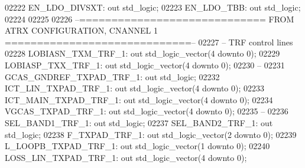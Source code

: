 \begin{DoxyCode}
02222     EN\_LDO\_DIVSXT:  \textcolor{keywordflow}{out} \textcolor{comment}{std\_logic};
02223     EN\_LDO\_TBB: \textcolor{keywordflow}{out} \textcolor{comment}{std\_logic};
02224 
02225 
02226 \textcolor{keyword}{    --============================= FROM ATRX CONFIGURATION, CNANNEL 1 =============================--}
02227 \textcolor{keyword}{    -- TRF control lines}
02228     LOBIASN\_TXM\_TRF\_1:  \textcolor{keywordflow}{out} \textcolor{comment}{std\_logic\_vector}(\textcolor{vhdllogic}{}\textcolor{vhdllogic}{4} \textcolor{keywordflow}{downto} \textcolor{vhdllogic}{}\textcolor{vhdllogic}{0});
02229     LOBIASP\_TXX\_TRF\_1:  \textcolor{keywordflow}{out} \textcolor{comment}{std\_logic\_vector}(\textcolor{vhdllogic}{}\textcolor{vhdllogic}{4} \textcolor{keywordflow}{downto} \textcolor{vhdllogic}{}\textcolor{vhdllogic}{0});
02230 \textcolor{keyword}{    --}
02231     GCAS\_GNDREF\_TXPAD\_TRF\_1:    \textcolor{keywordflow}{out} \textcolor{comment}{std\_logic};
02232     ICT\_LIN\_TXPAD\_TRF\_1:    \textcolor{keywordflow}{out} \textcolor{comment}{std\_logic\_vector}(\textcolor{vhdllogic}{}\textcolor{vhdllogic}{4} \textcolor{keywordflow}{downto} \textcolor{vhdllogic}{}\textcolor{vhdllogic}{0});
02233     ICT\_MAIN\_TXPAD\_TRF\_1:   \textcolor{keywordflow}{out} \textcolor{comment}{std\_logic\_vector}(\textcolor{vhdllogic}{}\textcolor{vhdllogic}{4} \textcolor{keywordflow}{downto} \textcolor{vhdllogic}{}\textcolor{vhdllogic}{0});
02234     VGCAS\_TXPAD\_TRF\_1:  \textcolor{keywordflow}{out} \textcolor{comment}{std\_logic\_vector}(\textcolor{vhdllogic}{}\textcolor{vhdllogic}{4} \textcolor{keywordflow}{downto} \textcolor{vhdllogic}{}\textcolor{vhdllogic}{0});
02235 \textcolor{keyword}{    --}
02236     SEL\_BAND1\_TRF\_1:    \textcolor{keywordflow}{out} \textcolor{comment}{std\_logic};
02237     SEL\_BAND2\_TRF\_1:    \textcolor{keywordflow}{out} \textcolor{comment}{std\_logic};
02238     F\_TXPAD\_TRF\_1:  \textcolor{keywordflow}{out} \textcolor{comment}{std\_logic\_vector}(\textcolor{vhdllogic}{}\textcolor{vhdllogic}{2} \textcolor{keywordflow}{downto} \textcolor{vhdllogic}{}\textcolor{vhdllogic}{0});
02239     L\_LOOPB\_TXPAD\_TRF\_1:    \textcolor{keywordflow}{out} \textcolor{comment}{std\_logic\_vector}(\textcolor{vhdllogic}{}\textcolor{vhdllogic}{1} \textcolor{keywordflow}{downto} \textcolor{vhdllogic}{}\textcolor{vhdllogic}{0});
02240     LOSS\_LIN\_TXPAD\_TRF\_1:   \textcolor{keywordflow}{out} \textcolor{comment}{std\_logic\_vector}(\textcolor{vhdllogic}{}\textcolor{vhdllogic}{4} \textcolor{keywordflow}{downto} \textcolor{vhdllogic}{}\textcolor{vhdllogic}{0});

\end{DoxyCode}
